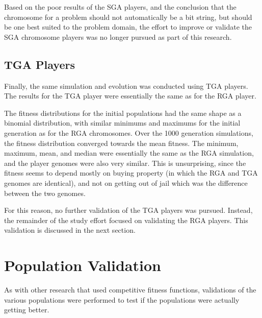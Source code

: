
Based on the poor results of the SGA players, and the conclusion that the
chromosome for a problem should not automatically be a bit string, but should be
one best suited to the problem domain, the effort to improve or validate the SGA
chromosome players was no longer pursued as part of this research.

\subsection{TGA Players} \label{6_TGS}

Finally, the same simulation and evolution was conducted using TGA players. The
results for the TGA player were essentially the same as for the RGA player.

The fitness distributions for the initial populations had the same shape as a
binomial distribution, with similar minimums and maximums for the initial
generation as for the RGA chromosomes. Over the 1000 generation simulations, the
fitness distribution converged towards the mean fitness. The minimum, maximum,
mean, and median were essentially the same as the RGA simulation, and the player
genomes were also very similar. This is unsurprising, since the fitness seems to
depend mostly on buying property (in which the RGA and TGA genomes are
identical), and not on getting out of jail which was the difference between the
two genomes.

For this reason, no further validation of the TGA players was pursued. Instead,
the remainder of the study effort focused on validating the RGA players. This
validation is discussed in the next section.

\section{Population Validation} \label{6_Validation}

As with other research that used competitive fitness functions, validations of
the various populations were performed to test if the populations were actually
getting better.

